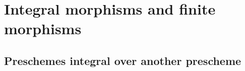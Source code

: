 \section{Integral morphisms and finite morphisms}
\label{section:II.6}


\subsection{Preschemes integral over another prescheme}
\label{subsection:II.6.1}












